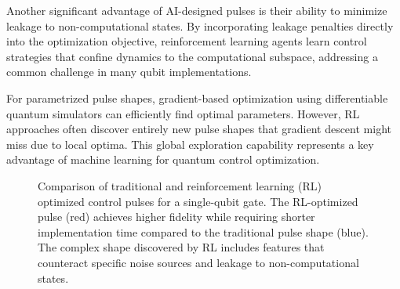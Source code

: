 Another significant advantage of AI-designed pulses is their ability to minimize leakage to non-computational states. By incorporating leakage penalties directly into the optimization objective, reinforcement learning agents learn control strategies that confine dynamics to the computational subspace, addressing a common challenge in many qubit implementations.

For parametrized pulse shapes, gradient-based optimization using differentiable quantum simulators can efficiently find optimal parameters. However, RL approaches often discover entirely new pulse shapes that gradient descent might miss due to local optima. This global exploration capability represents a key advantage of machine learning for quantum control optimization.

\begin{figure}[!t]
\centering
{}
\caption{Comparison of traditional and reinforcement learning (RL) optimized control pulses for a single-qubit gate. The RL-optimized pulse (red) achieves higher fidelity while requiring shorter implementation time compared to the traditional pulse shape (blue). The complex shape discovered by RL includes features that counteract specific noise sources and leakage to non-computational states.}
\label{fig:pulse_optimization}
\end{figure}

